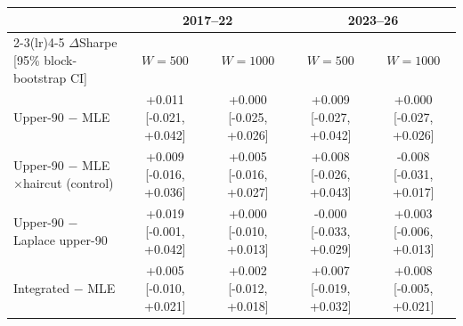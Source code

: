 \begin{tabular}{lcccc}\toprule
 & \multicolumn{2}{c}{2017--22} & \multicolumn{2}{c}{2023--26}\\\cmidrule(lr){2-3}\cmidrule(lr){4-5}
$\Delta$Sharpe [95\% block-bootstrap CI] & $W{=}500$ & $W{=}1000$ & $W{=}500$ & $W{=}1000$\\\midrule
Upper-90 $-$ MLE & +0.011 [-0.021, +0.042] & +0.000 [-0.025, +0.026] & +0.009 [-0.027, +0.042] & +0.000 [-0.027, +0.026] \\
Upper-90 $-$ MLE$\times$haircut (control) & +0.009 [-0.016, +0.036] & +0.005 [-0.016, +0.027] & +0.008 [-0.026, +0.043] & -0.008 [-0.031, +0.017] \\
Upper-90 $-$ Laplace upper-90 & +0.019 [-0.001, +0.042] & +0.000 [-0.010, +0.013] & -0.000 [-0.033, +0.029] & +0.003 [-0.006, +0.013] \\
Integrated $-$ MLE & +0.005 [-0.010, +0.021] & +0.002 [-0.012, +0.018] & +0.007 [-0.019, +0.032] & +0.008 [-0.005, +0.021] \\
\bottomrule\end{tabular}
